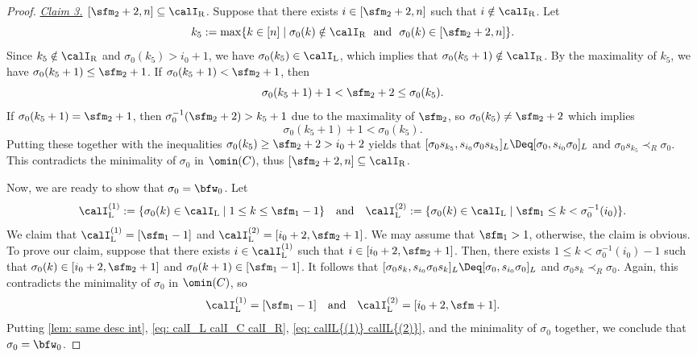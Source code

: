 \documentclass[12pt, reqno]{amsart}
\theoremstyle{definition}
\numberwithin{equation}{section} \numberwithin{figure}{section}
\numberwithin{table}{section}
\begin{document}
\begin{proof}
{\it \underline{Claim 3.} $[\sfm_2 + 2,n] \subseteq \calI_\mathrm{R}$.}
Suppose that there exists $i \in [\sfm_2 + 2,n]$ such that $i \notin \calI_\mathrm{R}$.
Let
\[
k_5 := \mathrm{max}\{k \in [n] \mid \sigma_0(k) \notin \calI_\mathrm{R} \ \  \text{and} \ \  \sigma_0(k)  \in [\sfm_2 + 2,n]\}.
\]
Since $k_5 \notin \calI_\mathrm{R}$ and $\sigma_0(k_5) >
i_0 + 1$, we have $\sigma_0(k_5) \in \calI_\mathrm{L}$, which implies that $\sigma_0(k_5 + 1) \notin \calI_\mathrm{R}$.
By the maximality of $k_5$, we have $\sigma_0(k_5+1) \le \sfm_2 + 1$.
If $\sigma_0(k_5+1) < \sfm_2 + 1$, then 
\[
\sigma_0(k_5+1) +1 < \sfm_2 + 2 \le \sigma_0(k_5).
\]
If $\sigma_0(k_5+1) = \sfm_2 + 1$, then $\sigma_0^{-1}(\sfm_2 + 2) > k_5+1$ due to the maximality of $\sfm_2$,  so $\sigma_0(k_5) \neq \sfm_2 + 2$ which implies
\[
\sigma_0(k_5+1) + 1 < \sigma_0(k_5).
\]
Putting these together with the inequalities $\sigma_0(k_5) \ge \sfm_2 + 2 >i_0 + 2$ yields that $[\sigma_0 s_{k_5}, s_{i_0} \sigma_0 s_{k_5}]_L \Deq [\sigma_0, s_{i_0}\sigma_0]_L$ and $\sigma_0 s_{k_5} \prec_R \sigma_0$.
This contradicts the minimality of $\sigma_0$ in $\omin(C)$, thus $[\sfm_2 + 2, n] \subseteq \calI_\mathrm{R}$.
\smallskip


Now, we are ready to show that $\sigma_0 = \bfw_0$.
Let 
\[
\calI^{(1)}_{\mathrm{L}} := \{ \sigma_0(k) \in \calI_{\mathrm{L}} \mid 1 \le k \le \sfm_1-1 \}
\quad \text{and} \quad
\calI^{(2)}_{\mathrm{L}} := \{ \sigma_0(k) \in \calI_{\mathrm{L}} \mid \sfm_1 \le k <\sigma_0^{-1}(i_0)  \}.
\]
We claim that $\calI^{(1)}_{\mathrm{L}} = [\sfm_1-1]$ and $\calI^{(2)}_{\mathrm{L}} = [i_0+2, \sfm_2+1]$.
We may assume that $\sfm_1 > 1$, otherwise, the claim is obvious.
To prove our claim, suppose that there exists $i \in \calI^{(1)}_{\mathrm{L}}$ such that $i \in [i_0+2,\sfm_2+1]$. 
Then, there exists $1 \le k < \sigma_0^{-1}(i_0) - 1$ such that $\sigma_0(k) \in [i_0+2, \sfm_2 + 1]$ and $\sigma_0(k + 1) \in [\sfm_1 - 1]$.
It follows that $[\sigma_0 s_{k}, s_{i_0} \sigma_0 s_{k}]_L \Deq [\sigma_0, s_{i_0}\sigma_0]_L$ and
$\sigma_0 s_{k} \prec_R \sigma_0$.
Again, this contradicts the minimality of $\sigma_0$ in $\omin(C)$, so 
\begin{align}\label{eq: calIL{(1)} calIL{(2)}}
\calI^{(1)}_{\mathrm{L}} = [\sfm_1-1]
\quad \text{and} \quad \calI^{(2)}_{\mathrm{L}} = [i_0+2, \sfm+1].
\end{align}
Putting
\cref{lem: same desc int},
\cref{eq: calI_L calI_C calI_R},
\cref{eq: calIL{(1)} calIL{(2)}}, and the minimality of $\sigma_0$ together, we conclude that $\sigma_0 = \bfw_0$.


\end{proof}
\end{document}

